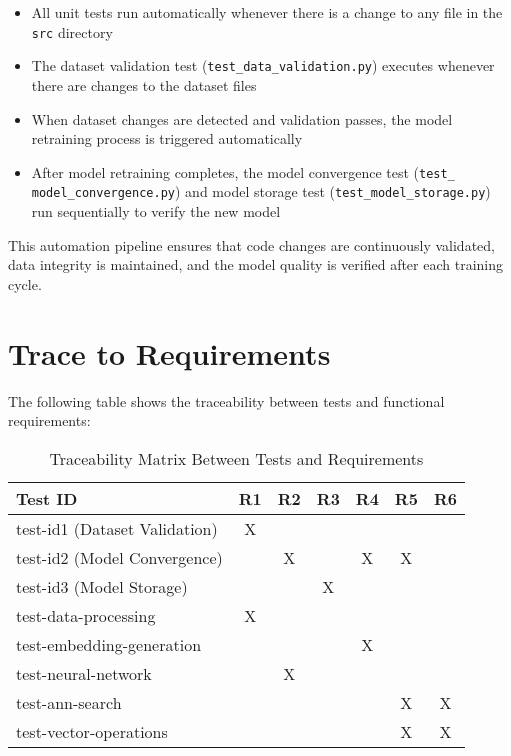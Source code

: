 \documentclass[12pt, titlepage]{article}
\begin{document}
\begin{itemize}
    \item All unit tests run automatically whenever there is a change to any file in the \texttt{src} directory
    \item The dataset validation test (\texttt{test\_data\_validation.py}) executes whenever there are changes to the dataset files
    \item When dataset changes are detected and validation passes, the model retraining process is triggered automatically
    \item After model retraining completes, the model convergence test (\texttt{test\_} \texttt{model\_convergence.py}) and model storage test (\texttt{test\_model\_storage.py}) run sequentially to verify the new model
\end{itemize}

This automation pipeline ensures that code changes are continuously validated, data integrity is maintained, and the model quality is verified after each training cycle.

\section{Trace to Requirements}
The following table shows the traceability between tests and functional requirements:

\begin{table}[h!]
\centering
\begin{tabular}{|l|c|c|c|c|c|c|}
\hline
\textbf{Test ID} & \textbf{R1} & \textbf{R2} & \textbf{R3} & \textbf{R4} & \textbf{R5} & \textbf{R6} \\
\hline
test-id1 (Dataset Validation) & X &  &  &  &  &  \\
\hline
test-id2 (Model Convergence) &  & X &  & X & X &  \\
\hline
test-id3 (Model Storage) &  &  & X &  &  &  \\
\hline
test-data-processing &  X &  &  &  &  &  \\
\hline
test-embedding-generation &  &  &  & X &  &  \\
\hline
test-neural-network &  & X &  &  &  &  \\
\hline
test-ann-search &  &  &  &  & X & X \\
\hline
test-vector-operations &  &  &  &  & X & X \\
\hline
\end{tabular}
\caption{Traceability Matrix Between Tests and Requirements}
\label{Table:req_trace}
\end{table}
\end{document}
